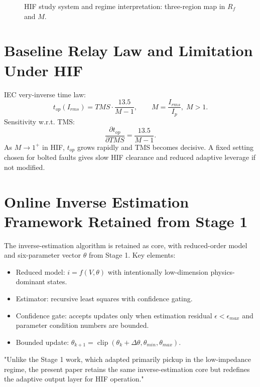 \documentclass[10pt,journal,compsoc]{IEEEtran}
\begin{document}
\begin{figure}[tb]
\centering
{}
\caption{HIF study system and regime interpretation: three-region map in $R_f$ and $M$.}
\label{fig:regime_map}
\end{figure}

\section{Baseline Relay Law and Limitation Under HIF}
IEC very-inverse time law:
\begin{equation}
  t_{op}(I_{rms}) = TMS\cdot \frac{13.5}{M-1}, \qquad M = \frac{I_{rms}}{I_p},\; M>1.
\end{equation}
Sensitivity w.r.t. TMS:
\begin{equation}
  \frac{\partial t_{op}}{\partial TMS} = \frac{13.5}{M-1}.
\end{equation}
As $M\to1^{+}$ in HIF, $t_{op}$ grows rapidly and TMS becomes decisive. A fixed setting chosen for bolted faults gives slow HIF clearance and reduced adaptive leverage if not modified.

\section{Online Inverse Estimation Framework Retained from Stage 1}
The inverse-estimation algorithm is retained as core, with reduced-order model and six-parameter vector $\theta$ from Stage 1. Key elements:
\begin{itemize}
  \item Reduced model: $i=f(V,\theta)$ with intentionally low-dimension physics-dominant states.
  \item Estimator: recursive least squares with confidence gating.
  \item Confidence gate: accepts updates only when estimation residual $\epsilon<\epsilon_{max}$ and parameter condition numbers are bounded.
  \item Bounded update: $\theta_{k+1}=\operatorname{clip}(\theta_k+\Delta\theta,\theta_{min},\theta_{max})$.
\end{itemize}
"Unlike the Stage 1 work, which adapted primarily pickup in the low-impedance regime, the present paper retains the same inverse-estimation core but redefines the adaptive output layer for HIF operation."
\end{document}
